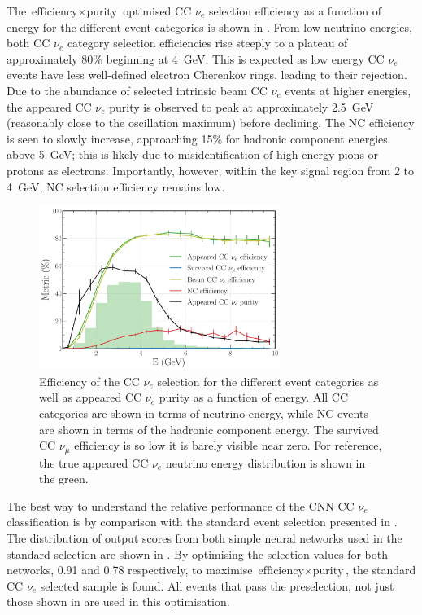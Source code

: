 The $\text{efficiency}\times\text{purity}$ optimised CC $\nu_{e}$ selection efficiency as a
function of energy for the different event categories is shown in
. From low neutrino energies, both CC $\nu_{e}$ category selection
efficiencies rise steeply to a plateau of approximately 80\% beginning at \SI{4}{GeV}. This is
expected as low energy CC $\nu_{e}$ events have less well-defined electron Cherenkov rings,
leading to their rejection. Due to the abundance of selected intrinsic beam CC $\nu_{e}$ events at
higher energies, the appeared CC $\nu_{e}$ purity is observed to peak at approximately
\SI{2.5}{\GeV} (reasonably close to the oscillation maximum) before declining. The NC efficiency
is seen to slowly increase, approaching 15\% for hadronic component energies above \SI{5}{\GeV};
this is likely due to misidentification of high energy pions or protons as electrons. Importantly,
however, within the key signal region from 2 to \SI{4}{\GeV}, NC selection efficiency remains low.

\begin{figure} %
    \includegraphics[width=0.7\textwidth]{diagrams/7-results/final_nuel_hists.pdf}
    \caption[Efficiency of the CC $\nu_{e}$ selection as a function of energy]
    {Efficiency of the CC $\nu_{e}$ selection for the different event categories as well as
        appeared CC $\nu_{e}$ purity as a function of energy. All CC categories are shown in terms
        of neutrino energy, while NC events are shown in terms of the hadronic component energy.
        The survived CC $\nu_{\mu}$ efficiency is so low it is barely visible near zero. For
        reference, the true appeared CC $\nu_{e}$ neutrino energy distribution is shown in the
        green.}
    \label{fig:final_nuel_hists}
\end{figure}

The best way to understand the relative performance of the CNN CC $\nu_{e}$ classification is by
comparison with the standard event selection presented in . The
distribution of output scores from both simple neural networks used in the standard selection are
shown in . By optimising the selection values for both
networks, 0.91 and 0.78 respectively, to maximise $\text{efficiency}\times\text{purity}$, the
standard CC $\nu_{e}$ selected sample is found. All events that pass the preselection, not just
those shown in  are used in this optimisation.

